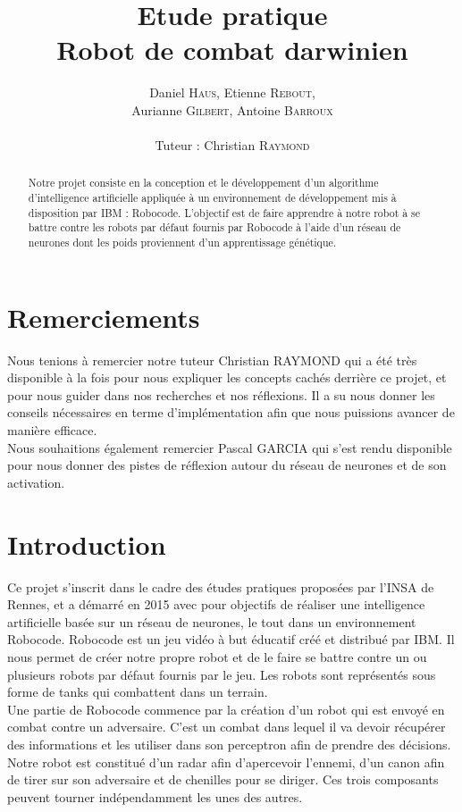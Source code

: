 \documentclass[a4paper,11pt]{article}
\title{ \textbf{Etude pratique \\
    Robot de combat darwinien} }
\author{Daniel \textsc{Haus}, Etienne \textsc{Rebout}, \\
        Aurianne \textsc{Gilbert}, Antoine \textsc{Barroux} \\
        \\
        Tuteur : Christian \textsc{Raymond}}
\date{}                    %
\begin{document}
          

\maketitle                 %
\thispagestyle{empty}      %



\begin{abstract}
Notre projet consiste en la conception \cite{robocodeapi} et le développement d'un algorithme d'intelligence artificielle appliquée à un environnement de développement mis à disposition par IBM : Robocode. L'objectif est de faire apprendre à notre robot à se battre contre les robots par défaut fournis par Robocode à l'aide  d'un réseau de neurones dont les poids proviennent d'un apprentissage génétique. 
\end{abstract} 

\section{Remerciements}
Nous tenions à remercier notre tuteur Christian RAYMOND qui a été très disponible à la fois pour nous expliquer les concepts cachés derrière ce projet, et pour nous guider dans nos recherches et nos réflexions. Il a su nous donner les conseils nécessaires en terme d'implémentation afin que nous puissions avancer de manière efficace.\\
Nous souhaitions également remercier Pascal GARCIA qui s'est rendu disponible pour nous donner des pistes de réflexion autour du réseau de neurones et de son activation.

\section{Introduction}  

Ce projet s'inscrit dans le cadre des études pratiques proposées par l'INSA de Rennes, et a démarré en 2015 avec pour objectifs de réaliser une intelligence artificielle basée sur un réseau de neurones, le tout dans un environnement Robocode. Robocode est un jeu vidéo à but éducatif créé et distribué par IBM. Il nous permet de créer notre propre robot et de le faire se battre contre un ou plusieurs robots par défaut fournis par le jeu. Les robots sont représentés sous forme de tanks qui combattent dans un terrain. \\
Une partie de Robocode commence par la création d'un robot qui est envoyé en combat contre un adversaire. C'est un combat dans lequel il va devoir récupérer des informations et les utiliser dans son perceptron afin de prendre des décisions. Notre robot est constitué d'un radar afin d'apercevoir l'ennemi, d'un canon afin de tirer sur son adversaire et de chenilles pour se diriger. Ces trois composants peuvent tourner indépendamment les unes des autres. 
\end{document}
